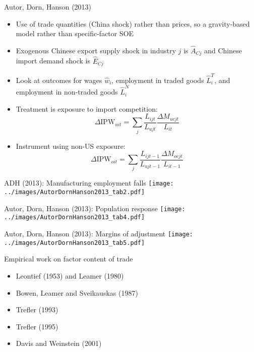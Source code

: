 \documentclass[10pt,notes=hide]{beamer}
\begin{document}
\begin{frame}{Autor, Dorn, Hanson (2013)}
\begin{itemize}
	\item Use of trade quantities (China shock) rather than prices, so a gravity-based model rather than specific-factor SOE
	\item Exogenous Chinese export supply shock in industry $j$ is $\hat{A}_{Cj}$ and Chinese import demand shock is $\hat{E}_{Cj}$
	\item Look at outcomes for wages $\hat{w}_i$, employment in traded goods $\hat{L}^{T}_{i}$, and employment in non-traded goods $\hat{L}^{N}_{i}$
	\item Treatment is exposure to import competition:
	\begin{equation*}
		\Delta \text{IPW}_{uit} = \sum_j \frac{L_{ijt}}{L_{ujt}} \frac{\Delta M_{ucjt}}{L_{it}}
	\end{equation*}
	\item Instrument using non-US exposure:
	\begin{equation*}
		\Delta \text{IPW}_{oit} = \sum_j \frac{L_{ijt-1}}{L_{ujt-1}} \frac{\Delta M_{ocjt}}{L_{it-1}}
	\end{equation*}
\end{itemize}
\end{frame}
\begin{frame}{ADH (2013): Manufacturing employment falls}
\texttt{[image: ../images/AutorDornHanson2013\_tab2.pdf]}
\end{frame}
\begin{frame}{Autor, Dorn, Hanson (2013): Population response}
\texttt{[image: ../images/AutorDornHanson2013\_tab4.pdf]}
\end{frame}
\begin{frame}{Autor, Dorn, Hanson (2013): Margins of adjustment}
\texttt{[image: ../images/AutorDornHanson2013\_tab5.pdf]}
\end{frame}
\begin{frame}{Empirical work on factor content of trade}
\begin{itemize}
	\item Leontief (1953) and Leamer (1980)
	\item Bowen, Leamer and Sveikauskas (1987)
	\item Trefler (1993)
	\item Trefler (1995)
	\item Davis and Weinstein (2001)
\end{itemize}
\end{frame}
\end{document}
